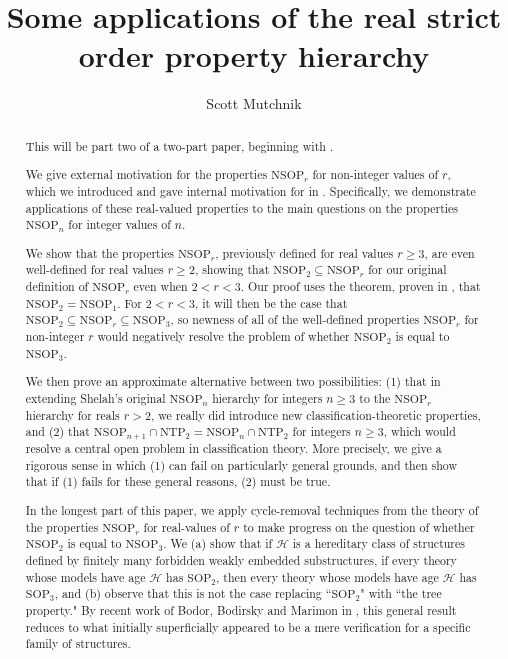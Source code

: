 \documentclass{amsart}
\title{Some applications of the real strict order property hierarchy}
\author{Scott Mutchnik}
\theoremstyle{definition}
\theoremstyle{remark}
\numberwithin{equation}{section}
\begin{document}
\maketitle

\begin{abstract}

This will be part two of a two-part paper, beginning with \cite{ApproxOrder}.

We give external motivation for the properties $\mathrm{NSOP}_{r}$ for non-integer values of $r$, which we introduced and gave internal motivation for in \cite{ApproxOrder}. Specifically, we demonstrate applications of these real-valued properties to the main questions on the properties $\mathrm{NSOP}_{n}$ for integer values of $n$.

We show that the properties $\mathrm{NSOP}_{r}$, previously defined for real values $r \geq 3$, are even well-defined for real values $r \geq 2$, showing that $\mathrm{NSOP}_{2} \subseteq \mathrm{NSOP}_{r}$ for our original definition of $\mathrm{NSOP}_{r}$ even when $2 < r < 3$. Our proof uses the theorem, proven in \cite{NSOP2}, that $\mathrm{NSOP}_{2} = \mathrm{NSOP}_{1}$. For $2 < r < 3$, it will then be the case that $\mathrm{NSOP}_{2} \subseteq \mathrm{NSOP}_{r} \subseteq \mathrm{NSOP}_{3}$, so newness of all of the well-defined properties $\mathrm{NSOP}_{r}$ for non-integer $r$ would negatively resolve the problem of whether $\mathrm{NSOP}_{2}$ is equal to $\mathrm{NSOP}_{3}$.

We then prove an approximate alternative between two possibilities: (1) that in extending Shelah's original $\mathrm{NSOP}_{n}$ hierarchy for integers $n \geq 3$ to the $\mathrm{NSOP}_{r}$ hierarchy for reals $r > 2$, we really did introduce new classification-theoretic properties, and (2) that $\mathrm{NSOP}_{n+1} \cap \mathrm{NTP}_{2} = \mathrm{NSOP}_{n} \cap \mathrm{NTP}_{2}$ for integers $n \geq 3$, which would resolve a central open problem in classification theory. More precisely, we give a rigorous sense in which (1) can fail on particularly general grounds, and then show that if (1) fails for these general reasons, (2) must be true. 

In the longest part of this paper, we apply cycle-removal techniques from the theory of the properties $\mathrm{NSOP}_{r}$ for real-values of $r$ to make progress on the question of whether $\mathrm{NSOP}_{2}$ is equal to $\mathrm{NSOP}_{3}$. We (a) show that if $\mathcal{H}$ is a hereditary class of structures defined by finitely many forbidden weakly embedded substructures, if every theory whose models have age $\mathcal{H}$ has $\mathrm{SOP}_{2}$, then every theory whose models have age $\mathcal{H}$ has $\mathrm{SOP}_{3}$, and (b) observe that this is not the case replacing ``$\mathrm{SOP}_{2}$" with ``the tree property." By recent work of Bodor, Bodirsky and Marimon in \cite{BBM25}, this general result reduces to what initially superficially appeared to be a mere verification for a specific family of structures.


\end{abstract}
\end{document}
